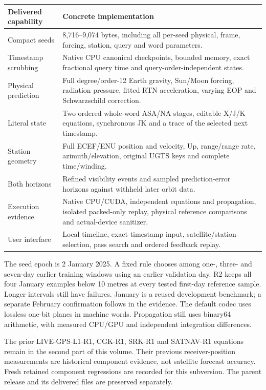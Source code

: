 \documentclass[11pt,a4paper]{article}
\begin{document}
\begin{tabularx}{\textwidth}{@{}P{.28\textwidth}Y@{}}\toprule
\textbf{Delivered capability} & \textbf{Concrete implementation}\\\midrule
Compact seeds & 8,716--9,074 bytes, including all per-seed physical, frame, forcing, station, query and word parameters.\\
Timestamp scrubbing & Native CPU canonical checkpoints, bounded memory, exact fractional query time and query-order-independent states.\\
Physical prediction & Full degree/order-12 Earth gravity, Sun/Moon forcing, radiation pressure, fitted RTN acceleration, varying EOP and Schwarzschild correction.\\
Literal state & Two ordered whole-word ASA/NA stages, editable X/J/K equations, synchronous JK and a trace of the selected next timestamp.\\
Station geometry & Full ECEF/ENU position and velocity, Up, range/range rate, azimuth/elevation, original UGTS keys and complete time/winding.\\
Both horizons & Refined visibility events and sampled prediction-error horizons against withheld later orbit data.\\
Execution evidence & Native CPU/CUDA, independent equations and propagation, isolated packed-only replay, physical reference comparisons and actual-device sanitizer.\\
User interface & Local timeline, exact timestamp input, satellite/station selection, pass search and ordered feedback replay.\\\bottomrule
\end{tabularx}

The seed epoch is 2 January 2025. A fixed rule chooses among one-, three- and
seven-day earlier training windows using an earlier validation day. R2 keeps all
four January examples below 10 metres at every tested first-day reference sample.
Longer intervals still have failures. January is a reused development benchmark;
a separate February confirmation follows in the evidence. The default codec
uses lossless one-bit planes in machine words. Propagation still uses binary64
arithmetic, with measured CPU/GPU and independent integration differences.

The prior LIVE-GPS-L1-R1, CGK-R1, SRK-R1 and SATNAV-R1 equations remain in the
second part of this volume. Their previous receiver-position measurements are
historical component evidence, not satellite forecast accuracy. Fresh retained
component regressions are recorded for this subversion. The parent release and
its delivered files are preserved separately.
\clearpage
\tableofcontents\clearpage

\end{document}
